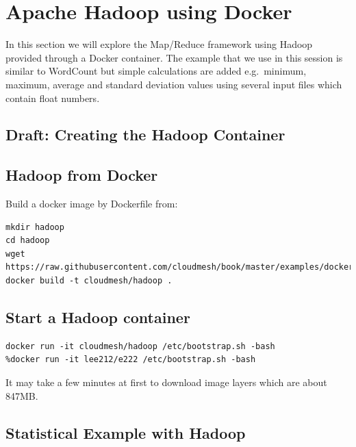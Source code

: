 
\FILENAME

\chapter{Apache Hadoop using Docker}


In this section we will explore the 
Map/Reduce framework using Hadoop provided through a Docker
container. The example that we use in this session is similar to
WordCount but simple calculations are added e.g.\ minimum, maximum,
average and standard deviation values using several input files which
contain float numbers.

\section{Draft: Creating the Hadoop Container}

\section{Hadoop from Docker}

Build a docker image by Dockerfile from:

\begin{lstlisting}
mkdir hadoop
cd hadoop
wget https://raw.githubusercontent.com/cloudmesh/book/master/examples/docker/hadoop/Dockerfile
docker build -t cloudmesh/hadoop .
\end{lstlisting}


\section{Start a Hadoop container}

\begin{lstlisting}
docker run -it cloudmesh/hadoop /etc/bootstrap.sh -bash
%docker run -it lee212/e222 /etc/bootstrap.sh -bash
\end{lstlisting}

It may take a few minutes at first to download image layers which are
about 847MB\@.

\section{Statistical Example with Hadoop}  

